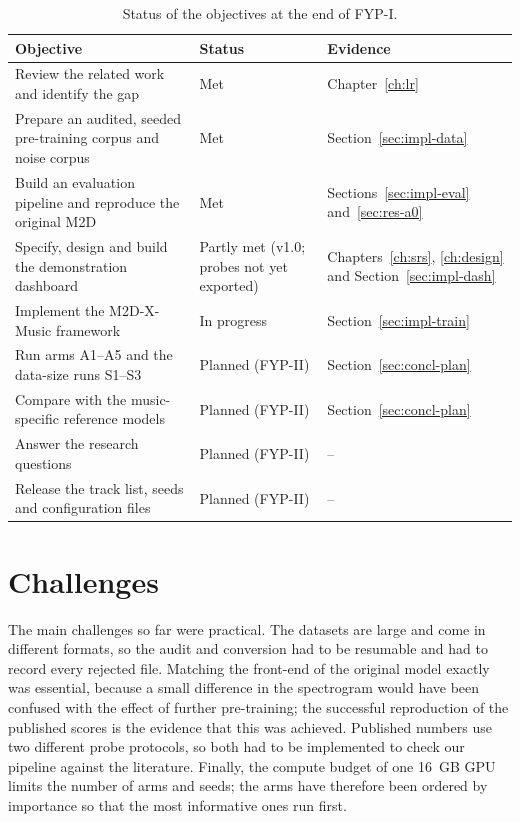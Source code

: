 \begin{table}[htbp]
\centering
\caption[Status of the objectives]{Status of the objectives at the end of FYP-I.}
\label{tab:concl-objectives}
\small\singlespacing
\begin{tabularx}{\linewidth}{Y>{\raggedright\arraybackslash}p{2.4cm}>{\raggedright\arraybackslash}p{4.4cm}}
\toprule
\textbf{Objective} & \textbf{Status} & \textbf{Evidence}\\
\midrule
Review the related work and identify the gap & Met & Chapter~\ref{ch:lr}\\
Prepare an audited, seeded pre-training corpus and noise corpus & Met & Section~\ref{sec:impl-data}\\
Build an evaluation pipeline and reproduce the original M2D & Met & Sections~\ref{sec:impl-eval} and~\ref{sec:res-a0}\\
Specify, design and build the demonstration dashboard & Partly met (v1.0; probes not yet exported) & Chapters~\ref{ch:srs}, \ref{ch:design} and Section~\ref{sec:impl-dash}\\
Implement the M2D-X-Music framework & In progress & Section~\ref{sec:impl-train}\\
Run arms A1--A5 and the data-size runs S1--S3 & Planned (FYP-II) & Section~\ref{sec:concl-plan}\\
Compare with the music-specific reference models & Planned (FYP-II) & Section~\ref{sec:concl-plan}\\
Answer the research questions & Planned (FYP-II) & --\\
Release the track list, seeds and configuration files & Planned (FYP-II) & --\\
\bottomrule
\end{tabularx}
\end{table}

\section{Challenges}
\label{sec:concl-challenges}
The main challenges so far were practical. The datasets are large and come in different formats, so the audit and conversion had to be resumable and had to record every rejected file. Matching the front-end of the original model exactly was essential, because a small difference in the spectrogram would have been confused with the effect of further pre-training; the successful reproduction of the published scores is the evidence that this was achieved. Published numbers use two different probe protocols, so both had to be implemented to check our pipeline against the literature. Finally, the compute budget of one 16~GB GPU limits the number of arms and seeds; the arms have therefore been ordered by importance so that the most informative ones run first.

